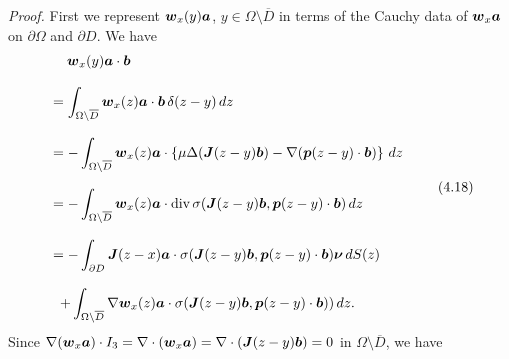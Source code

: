 {\it\noindent Proof.}
First we represent $\mbox{\boldmath $w$}_x(y)\mbox{\boldmath $a$}$, $y\in\Omega\setminus\overline{D}$ in terms of
the Cauchy data of $\mbox{\boldmath $w$}_x\mbox{\boldmath $a$}$ on $\partial\Omega$ and $\partial D$.
We have
$$\begin{array}{l}
\displaystyle
\,\,\,\,\,\,
\mbox{\boldmath $w$}_x(y)\mbox{\boldmath $a$}\cdot\mbox{\boldmath $b$}
\\
\\
\displaystyle
=\int_{\Omega\setminus\overline{D}}\mbox{\boldmath $w$}_x(z)\mbox{\boldmath $a$}\cdot\mbox{\boldmath $b$}\,\delta(z-y)\,dz
\\
\\
\displaystyle
=-\int_{\Omega\setminus\overline{D}}\mbox{\boldmath $w$}_x(z)\mbox{\boldmath $a$}\cdot
\left\{\mu\Delta(\mbox{\boldmath $J$}(z-y)\mbox{\boldmath $b$})-\nabla(\mbox{\boldmath $p$}(z-y)\cdot\mbox{\boldmath $b$})\right\}\,dz
\\
\\
\displaystyle
=-\int_{\Omega\setminus\overline{D}}\mbox{\boldmath $w$}_x(z)\mbox{\boldmath $a$}\cdot
\text{div}\,\sigma(\mbox{\boldmath $J$}(z-y)\mbox{\boldmath $b$},\mbox{\boldmath $p$}(z-y)\cdot\mbox{\boldmath $b$})\,dz
\\
\\
\displaystyle
=-\int_{\partial D}\mbox{\boldmath $J$}(z-x)\mbox{\boldmath $a$}\cdot
\sigma(\mbox{\boldmath $J$}(z-y)\mbox{\boldmath $b$},
\mbox{\boldmath $p$}(z-y)\cdot\mbox{\boldmath $b$})\mbox{\boldmath $\nu$}\,dS(z)
\\
\\
\displaystyle
\,\,\,
+\int_{\Omega\setminus\overline{D}}\nabla\mbox{\boldmath $w$}_x(z)\mbox{\boldmath $a$}
\cdot\sigma(\mbox{\boldmath $J$}(z-y)\mbox{\boldmath $b$},
\mbox{\boldmath $p$}(z-y)\cdot\mbox{\boldmath $b$}))\,dz.
\end{array}
\tag {4.18}
$$
Since $\nabla(\mbox{\boldmath $w$}_x\mbox{\boldmath $a$})\cdot I_3=\nabla\cdot(\mbox{\boldmath $w$}_x\mbox{\boldmath $a$})=\nabla\cdot
 (\mbox{\boldmath $J$}(z-y)\mbox{\boldmath $b$})=0$ in
$\Omega\setminus\overline{D}$, we have
